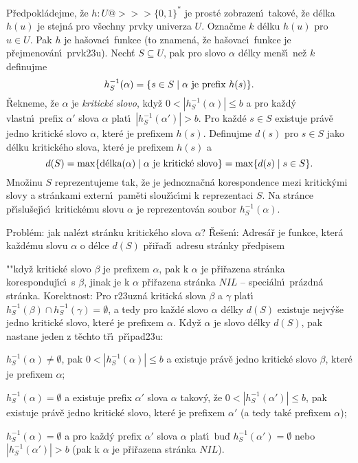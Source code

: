 \documentclass[a4paper,12pt]{article}
\begin{document}
\flushpar P\v redpokl\'adejme, \v ze $h:U@>>>\{0,1\}^{*}$ je prost\'e 
zobrazen\'\i\ takov\'e, \v ze d\'elka $h(u)$ je stejn\'a pro v\v sechny prvky 
univerza $U$.  Ozna\v cme $k$ d\'elku $h(u)$ pro $u\in U$. Pak $
h$ je 
ha\v sovac\'\i\ funkce (to znamen\'a, \v ze ha\v sovac\'\i\ funkce je p\v rejmenov\'an\'\i\ prvk\accent23u).  Nech\v t $S\subseteq U$, pak pro slovo $
\alpha$ d\'elky 
men\v s\'\i\ ne\v z $k$ definujme 
$$h^{-1}_S(\alpha )=\{s\in S\mid\alpha\text{\rm\ je prefix }h(s)\}
.$$
\v Rekneme, \v ze $\alpha$ je \emph{kritick\'e} \emph{slovo}, kdy\v z 
$0<|h^{-1}_S(\alpha )|\le b$ a pro ka\v zd\'y vlastn\'\i\ prefix $
\alpha'$ slova $\alpha$ plat\'\i\ 
$|h^{-1}_S(\alpha')|>b$.  Pro ka\v zd\'e $s\in S$ existuje pr\'av\v e jedno 
kritick\'e slovo $\alpha$, kter\'e je prefixem $h(s)$.  Definujme $
d(s)$ 
pro $s\in S$ jako d\'elku kritick\'eho slova, kter\'e je prefixem 
$h(s)$ a 
$$d(S)=\max\{\text{\rm d\'elka}(\alpha )\mid\alpha\text{\rm\ je kritick\'e slovo}
\}=\max\{d(s)\mid s\in S\}.$$
Mno\v zinu $S$ reprezentujeme tak, \v ze je jednozna\v cn\'a 
korespondence mezi kritick\'ymi slovy a str\'ankami extern\'\i\ 
pam\v eti slou\v z\'\i\-c\'\i\-mi k reprezentaci $S$.  Na str\'ance 
p\v r\'\i slu\v sej\'\i c\'\i\ kritick\'emu slovu $\alpha$ je reprezentov\'an soubor 
$h^{-1}_S(\alpha )$.  

\flushpar Probl\'em: jak nal\'ezt str\'anku kritick\'eho slova 
$\alpha$?\newline 
\v Re\v sen\'\i : Adres\'a\v r je funkce, kter\'a ka\v zd\'emu slovu $
\alpha$ o 
d\'elce $d(S)$ p\v ri\v rad\'\i\ adresu str\'anky p\v redpisem
\roster
\item"{}"kdy\v z kritick\'e slovo $\beta$ je prefixem $\alpha$, pak k $
\alpha$ je 
p\v ri\v razena str\'an\-ka koresponduj\'\i c\'\i\ s $\beta$, jinak je k $
\alpha$ 
p\v ri\v razena str\'an\-ka $NIL$ -- speci\'aln\'\i\ pr\'azdn\'a str\'anka.
\endroster
\flushpar Korektnost: Pro r\accent23uzn\'a kritick\'a slova 
$\beta$ a $\gamma$ plat\'\i\ $h^{-1}_S(\beta )\cap h^{-1}_S(\gamma 
)=\emptyset$, a tedy pro ka\v zd\'e slovo $\alpha$ 
d\'elky $d(S)$ existuje nejv\'y\v se jedno kritick\'e slovo, kter\'e 
je prefixem $\alpha$. Kdy\v z $\alpha$ je slovo d\'elky $d(S)$, pak nastane 
jeden z t\v echto t\v r\'\i\ p\v r\'\i pad\accent23u:
\roster
\item
$h^{-1}_S(\alpha )\ne\emptyset$, pak $0<|h^{-1}_S(\alpha )|\le b$ a existuje pr\'av\v e jedno kritick\'e slovo $
\beta$, 
kter\'e je prefixem $\alpha$; 
\item
$h^{-1}_S(\alpha )=\emptyset$ a existuje prefix $\alpha'$ slova $
\alpha$ takov\'y, \v ze 
$0<|h^{-1}_S(\alpha')|\le b$, pak existuje pr\'av\v e jedno kritick\'e slovo, kter\'e je 
prefixem $\alpha'$ (a tedy tak\'e prefixem $\alpha$);
\item
$h^{-1}_S(\alpha )=\emptyset$ a pro ka\v zd\'y prefix $\alpha'$ slova $
\alpha$ plat\'\i\ bu\v d 
$h^{-1}_S(\alpha')=\emptyset$ nebo $|h^{-1}_S(\alpha')|>b$ (pak k $
\alpha$ je p\v ri\v razena 
str\'anka $NIL$).
\endroster
\end{document}
